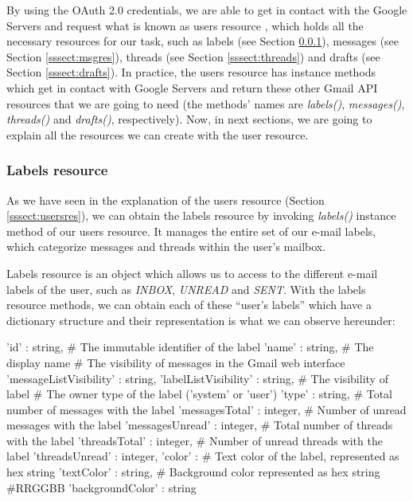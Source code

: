 By using the OAuth 2.0 credentials, we are able to get in contact with the Google Servers and request what is known as users resource \citep[/v1/reference/users]{gmailAPI}, which holds all the necessary resources for our task, such as labels (see Section \ref{sssect:labres}), messages (see Section \ref{sssect:msgres}), threads (see Section \ref{sssect:threads}) and drafts (see Section \ref{sssect:drafts}). In practice, the users resource has instance methods which get in contact with Google Servers and return these other Gmail API resources that we are going to need (the methods' names are \textit{labels()}, \textit{messages()}, \textit{threads()} and \textit{drafts()}, respectively). Now, in next sections, we are going to explain all the resources we can create with the user resource.

\subsubsection{Labels resource}\label{sssect:labres}
As we have seen in the explanation of the users resource (Section \ref{sssect:usersres}), we can obtain the labels resource \citep[/v1/reference/users/labels]{gmailAPI} by invoking \textit{labels()} instance method of our users resource. It manages the entire set of our e-mail labels, which  categorize messages and threads within the user's mailbox.

Labels resource is an object which allows us to access to the different e-mail labels of the user, such as \textit{INBOX}, \textit{UNREAD} and \textit{SENT}. With the labels resource methods, we can obtain each of these ``user's labels'' which have a dictionary structure and their representation is what we can observe hereunder:

\begin{python}
	{
		'id' : string, # The immutable identifier of the label
		'name' : string, # The display name
		# The visibility of messages in the Gmail web interface
		'messageListVisibility' : string,
		'labelListVisibility' : string, # The visibility of label
		# The owner type of the label ('system' or 'user')
		'type' : string,
		# Total number of messages with the label
		'messagesTotal' : integer,
		# Number of unread messages with the label
		'messagesUnread' : integer,
		# Total number of threads with the label
		'threadsTotal' : integer,
		# Number of unread threads with the label
		'threadsUnread' : integer,
		'color' : {
			# Text color of the label, represented as hex string
			'textColor' : string,
			# Background color represented as hex string #RRGGBB
			'backgroundColor' : string 
		}
	}
\end{python}

